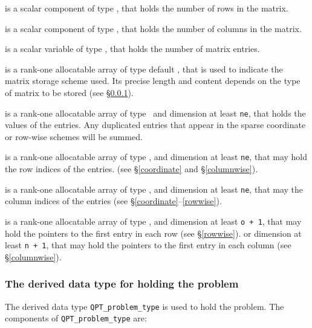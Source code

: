 \documentclass{galahad}
\begin{document}
\begin{description}

 is a scalar component of type \integer,
that holds the number of rows in the matrix.

 is a scalar component of type \integer,
that holds the number of columns in the matrix.

 is a scalar variable of type \integer, that
holds the number of matrix entries.

 is a rank-one allocatable array of type default \character, that
is used to indicate the matrix storage scheme used. Its precise length and
content depends on the type of matrix to be stored (see \S\ref{typeprob}).

 is a rank-one allocatable array of type \realdp\,
and dimension at least {\tt ne}, that holds the values of the entries.
Any duplicated entries that appear in the sparse
coordinate or row-wise schemes will be summed.

 is a rank-one allocatable array of type \integer,
and dimension at least {\tt ne}, that may hold the row indices of the entries.
(see \S\ref{coordinate} and \S\ref{columnwise}).

 is a rank-one allocatable array of type \integer,
and dimension at least {\tt ne}, that may the column indices of the entries
(see \S\ref{coordinate}--\ref{rowwise}).

 is a rank-one allocatable array of type \integer,
and dimension at least {\tt o + 1}, that may hold the pointers to
the first entry in each row (see \S\ref{rowwise}).
or dimension at least {\tt n + 1}, that may hold the pointers to
the first entry in each column (see \S\ref{columnwise}).

\end{description}


\subsubsection{The derived data type for holding the problem}\label{typeprob}
The derived data type {\tt QPT\_problem\_type} is used to hold
the problem. The components of
{\tt QPT\_problem\_type}
are:
\end{document}
